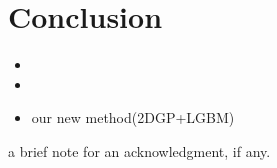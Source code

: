 \documentclass{pasj01}
\begin{document}
\section{Conclusion}
\begin{itemize}
\item 
\item 
\item our new method(2DGP+LGBM)
\end{itemize}

\begin{ack}
 a brief note for an acknowledgment, if any.   
\end{ack}
\end{document}
